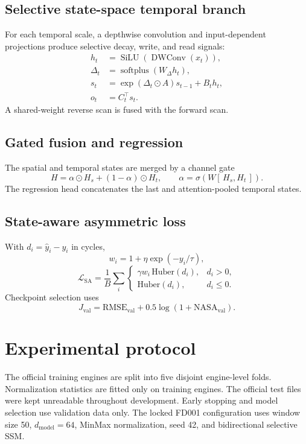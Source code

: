 \documentclass[conference]{IEEEtran}
\begin{document}
\subsection{Selective state-space temporal branch}
For each temporal scale, a depthwise convolution and input-dependent projections produce selective decay, write, and read signals:
\begin{align}
h_t &= \operatorname{SiLU}(\operatorname{DWConv}(x_t)),\\
\Delta_t &= \operatorname{softplus}(W_\Delta h_t),\\
s_t &= \exp(\Delta_t\odot A)s_{t-1}+B_t h_t,\\
o_t &= C_t^\top s_t.
\end{align}
A shared-weight reverse scan is fused with the forward scan.

\subsection{Gated fusion and regression}
The spatial and temporal states are merged by a channel gate
\begin{equation}
H=\alpha\odot H_s+(1-\alpha)\odot H_t,\qquad
\alpha=\sigma(W[\,H_s,H_t\,]).
\end{equation}
The regression head concatenates the last and attention-pooled temporal states.

\subsection{State-aware asymmetric loss}
With $d_i=\hat y_i-y_i$ in cycles,
\begin{equation}
w_i=1+\eta\exp(-y_i/\tau),
\end{equation}
\begin{equation}
\mathcal L_{\mathrm{SA}}=\frac1B\sum_i
\begin{cases}
\gamma w_i\,\mathrm{Huber}(d_i), & d_i>0,\\
\mathrm{Huber}(d_i), & d_i\le0.
\end{cases}
\end{equation}
Checkpoint selection uses
\begin{equation}
J_{\mathrm{val}}=\mathrm{RMSE}_{\mathrm{val}}+0.5\log(1+\mathrm{NASA}_{\mathrm{val}}).
\end{equation}

\section{Experimental protocol}
The official training engines are split into five disjoint engine-level folds. Normalization statistics are fitted only on training engines. The official test files were kept unreadable throughout development. Early stopping and model selection use validation data only. The locked FD001 configuration uses window size 50, $d_{\mathrm{model}}=64$, MinMax normalization, seed 42, and bidirectional selective SSM.
\end{document}
